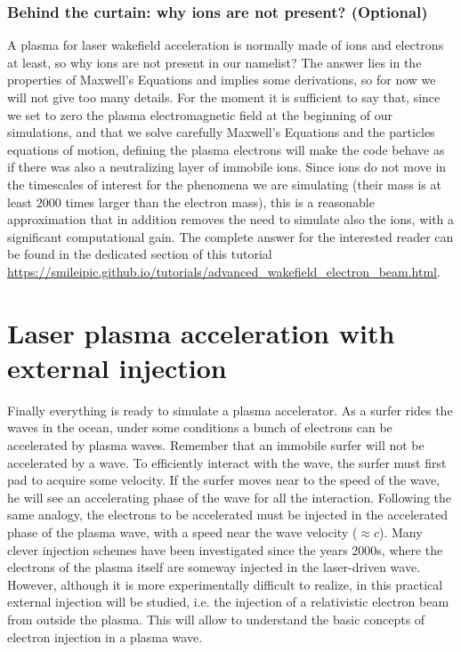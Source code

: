 \documentclass{article}
\begin{document}
\subsubsection*{Behind the curtain: why ions are not present? (Optional)} A plasma for laser wakefield acceleration is normally made of ions and electrons at least, so why ions are not present in our namelist? The answer lies in the properties of Maxwell's Equations and implies some derivations, so for now we will not give too many details. For the moment it is sufficient to say that, since we set to zero the plasma electromagnetic field at the beginning of our simulations, and that we solve carefully Maxwell's Equations and the particles equations of motion, defining the plasma electrons will make the code behave as if there was also a neutralizing layer of immobile ions. Since ions do not move in the timescales of interest for the phenomena we are simulating (their mass is at  least $2000$ times larger than the electron mass), this is a reasonable approximation that in addition removes the need to simulate also the ions, with a significant computational gain. The complete answer for the interested reader can be found in the dedicated section of this tutorial \url{https://smileipic.github.io/tutorials/advanced_wakefield_electron_beam.html}.



\newpage

\section{Laser plasma acceleration with external injection}
Finally everything is ready to simulate a plasma accelerator. As a surfer rides the waves in the ocean,  under some conditions a bunch of electrons can be accelerated by plasma waves. Remember that an immobile surfer will not be accelerated by a wave. To efficiently interact with the wave, the surfer must first pad to acquire some velocity. If the surfer moves near to the speed of the wave, he will see an accelerating phase of the wave for all the interaction.
Following the same analogy,  the electrons to be accelerated must be injected in the accelerated phase of the plasma wave, with a speed near the wave velocity  ($\approx c$). Many clever injection schemes have been investigated since  the years 2000s, where the electrons of the plasma itself are someway injected in the laser-driven wave. However, although it is more experimentally difficult to realize, in this practical external injection will be studied, i.e. the injection of a relativistic electron beam from outside the plasma. This will allow to understand the basic concepts of electron injection in a plasma wave. \\
\end{document}
